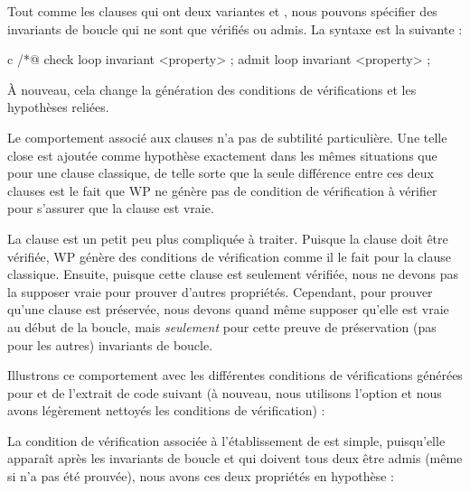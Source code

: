 

\label{l3:statements-loops-inv-kinds}


Tout comme les clauses  qui ont deux variantes
 et , nous pouvons spécifier des invariants
de boucle qui ne sont que vérifiés ou admis. La syntaxe est la suivante :


\begin{CodeBlock}{c}
/*@ check loop invariant <property> ;
    admit loop invariant <property> ;
\end{CodeBlock}


À nouveau, cela change la génération des conditions de vérifications et les
hypothèses reliées.


Le comportement associé aux clauses  n'a pas
de subtilité particulière. Une telle close est ajoutée comme hypothèse exactement
dans les mêmes situations que pour une clause 
classique, de telle sorte que la seule différence entre ces deux clauses est le
fait que WP ne génère pas de condition de vérification à vérifier pour s'assurer
que la clause  est vraie.


La clause  est un petit peu plus compliquée à
traiter. Puisque la clause doit être vérifiée, WP génère des conditions de
vérification comme il le fait pour la clause 
classique. Ensuite, puisque cette clause est seulement vérifiée, nous ne devons
pas la supposer vraie pour prouver d'autres propriétés. Cependant, pour prouver
qu'une clause  est préservée, nous devons
quand même supposer qu'elle est vraie au début de la boucle, mais
\textit{seulement} pour cette preuve de préservation (pas pour les autres)
invariants de boucle.


Illustrons ce comportement avec les différentes conditions de vérifications
générées pour  et  de l'extrait de code suivant
(à nouveau, nous utilisons l'option  et nous avons
légèrement nettoyés les conditions de vérification) :




La condition de vérification associée à l'établissement de  est
simple, puisqu'elle apparaît après les invariants de boucle  et
 qui doivent tous deux être admis (même si  n'a
pas été prouvée), nous avons ces deux propriétés en hypothèse :


